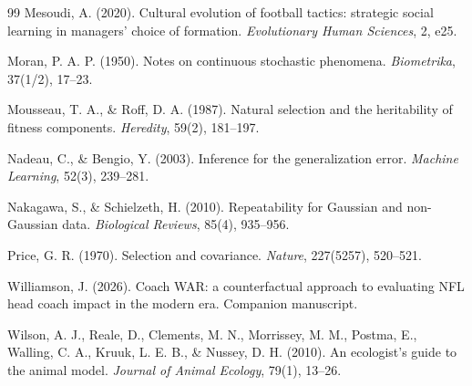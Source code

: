 \documentclass[11pt]{article}
\begin{document}
\begin{thebibliography}{99}
Mesoudi, A. (2020). Cultural evolution of football tactics: strategic social
learning in managers' choice of formation. \textit{Evolutionary Human Sciences},
2, e25.

Moran, P. A. P. (1950). Notes on continuous stochastic phenomena.
\textit{Biometrika}, 37(1/2), 17--23.

Mousseau, T. A., \& Roff, D. A. (1987). Natural selection and the heritability of
fitness components. \textit{Heredity}, 59(2), 181--197.

Nadeau, C., \& Bengio, Y. (2003). Inference for the generalization error.
\textit{Machine Learning}, 52(3), 239--281.

Nakagawa, S., \& Schielzeth, H. (2010). Repeatability for Gaussian and non-Gaussian
data. \textit{Biological Reviews}, 85(4), 935--956.

Price, G. R. (1970). Selection and covariance. \textit{Nature}, 227(5257),
520--521.

Williamson, J. (2026). Coach WAR: a counterfactual approach to evaluating NFL head
coach impact in the modern era. Companion manuscript.

Wilson, A. J., Reale, D., Clements, M. N., Morrissey, M. M., Postma, E., Walling,
C. A., Kruuk, L. E. B., \& Nussey, D. H. (2010). An ecologist's guide to the animal
model. \textit{Journal of Animal Ecology}, 79(1), 13--26.

\end{thebibliography}
\end{document}
